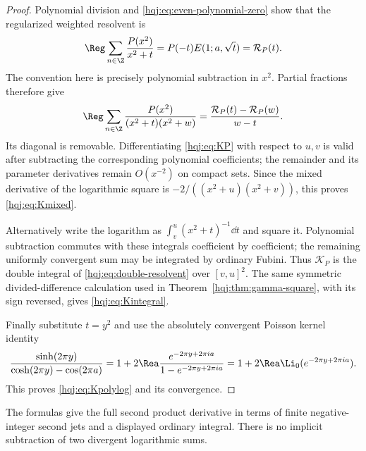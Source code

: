 \begin{proof}
Polynomial division and \eqref{hqj:eq:even-polynomial-zero} show that
the regularized weighted resolvent is
\[
\Reg\sum_{n\in\Z}\frac{P(x^2)}{x^2+t}
=P(-t)E(1;a,\sqrt t)=\mathcal R_P(t).
\]
The convention here is precisely polynomial subtraction in $x^2$.
Partial fractions therefore give
\begin{equation}\label{hqj:eq:double-resolvent}
\Reg\sum_{n\in\Z}\frac{P(x^2)}{(x^2+t)(x^2+w)}
=\frac{\mathcal R_P(t)-\mathcal R_P(w)}{w-t}.
\end{equation}
Its diagonal is removable. Differentiating
\eqref{hqj:eq:KP} with respect to $u,v$ is valid after subtracting the
corresponding polynomial coefficients; the remainder and its
parameter derivatives remain $O(x^{-2})$ on compact sets. Since the
mixed derivative of the logarithmic square is
$-2/((x^2+u)(x^2+v))$, this proves \eqref{hqj:eq:Kmixed}.

Alternatively write the logarithm as
$\int_v^u(x^2+t)^{-1}\dd t$ and square it. Polynomial subtraction
commutes with these integrals coefficient by coefficient; the remaining
uniformly convergent sum may be integrated by ordinary Fubini. Thus
$\mathcal K_P$ is the double integral of
\eqref{hqj:eq:double-resolvent} over $[v,u]^2$.
The same symmetric divided-difference calculation used in
Theorem~\ref{hqj:thm:gamma-square}, with its sign reversed, gives
\eqref{hqj:eq:Kintegral}.

Finally substitute $t=y^2$ and use the absolutely convergent Poisson
kernel identity
\[
\frac{\sinh(2\pi y)}{\cosh(2\pi y)-\cos(2\pi a)}
=1+2\Rea\frac{e^{-2\pi y+2\pi ia}}{1-e^{-2\pi y+2\pi ia}}
=1+2\Rea\Li_0(e^{-2\pi y+2\pi ia}).
\]
This proves \eqref{hqj:eq:Kpolylog} and its convergence.
\end{proof}
The formulas give the full second product derivative in terms of
finite negative-integer second jets and a displayed ordinary integral.
There is no implicit subtraction of two divergent logarithmic sums.

